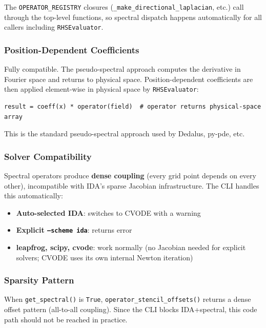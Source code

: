 The \texttt{OPERATOR\_REGISTRY} closures (\texttt{\_make\_directional\_laplacian}, etc.) call
through the top-level functions, so spectral dispatch happens automatically
for all callers including \texttt{RHSEvaluator}.

\subsubsection{Position-Dependent Coefficients}
\label{sec:spectral-pos-dep}

Fully compatible. The pseudo-spectral approach computes the derivative in
Fourier space and returns to physical space. Position-dependent coefficients
are then applied element-wise in physical space by \texttt{RHSEvaluator}:

\begin{lstlisting}[style=python]
result = coeff(x) * operator(field)  # operator returns physical-space array
\end{lstlisting}

This is the standard pseudo-spectral approach used by Dedalus, py-pde, etc.

\subsubsection{Solver Compatibility}
\label{sec:spectral-compatibility}

Spectral operators produce \textbf{dense coupling} (every grid point depends on
every other), incompatible with IDA's sparse Jacobian infrastructure.
The CLI handles this automatically:

\begin{itemize}
  \item \textbf{Auto-selected IDA}: switches to CVODE with a warning
  \item \textbf{Explicit \texttt{--scheme ida}}: returns error
  \item \textbf{leapfrog, scipy, cvode}: work normally (no Jacobian needed for explicit
    solvers; CVODE uses its own internal Newton iteration)
\end{itemize}

\subsubsection{Sparsity Pattern}
\label{sec:spectral-sparsity}

When \texttt{get\_spectral()} is \texttt{True}, \texttt{operator\_stencil\_offsets()} returns a
dense offset pattern (all-to-all coupling). Since the CLI blocks
IDA+spectral, this code path should not be reached in practice.

